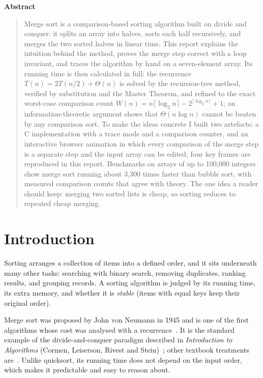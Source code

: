 \documentclass[11pt,a4paper]{article}
\theoremstyle{plain}
\theoremstyle{definition}
\renewcommand{\lg}{\log_2}
\begin{document}
\begin{center}{\large\bfseries Abstract}\end{center}
\begin{quote}\small
Merge sort is a comparison-based sorting algorithm built on divide and conquer: it splits an array into halves, sorts each half recursively, and merges the two sorted halves in linear time. This report explains the intuition behind the method, proves the merge step correct with a loop invariant, and traces the algorithm by hand on a seven-element array. Its running time is then calculated in full: the recurrence $T(n)=2T(n/2)+\Theta(n)$ is solved by the recursion-tree method, verified by substitution and the Master Theorem, and refined to the exact worst-case comparison count $W(n)=n\lceil\lg n\rceil-2^{\lceil\lg n\rceil}+1$; an information-theoretic argument shows that $\Theta(n\log n)$ cannot be beaten by any comparison sort. To make the ideas concrete I built two artefacts: a C implementation with a trace mode and a comparison counter, and an interactive browser animation in which every comparison of the merge step is a separate step and the input array can be edited; four key frames are reproduced in this report. Benchmarks on arrays of up to 100,000 integers show merge sort running about 3,300 times faster than bubble sort, with measured comparison counts that agree with theory. The one idea a reader should keep: merging two sorted lists is cheap, so sorting reduces to repeated cheap merging.
\end{quote}
\vspace{0.3em}
\begingroup
\renewcommand{\contentsname}{\large Contents}
\small
\setcounter{tocdepth}{1}
\tableofcontents
\endgroup
\newpage

\section{Introduction}
Sorting arranges a collection of items into a defined order, and it sits underneath many other tasks: searching with binary search, removing duplicates, ranking results, and grouping records. A sorting algorithm is judged by its running time, its extra memory, and whether it is \emph{stable} (items with equal keys keep their original order).

Merge sort was proposed by John von Neumann in 1945 and is one of the first algorithms whose cost was analysed with a recurrence~\cite{knuth3}. It is the standard example of the divide-and-conquer paradigm described in \emph{Introduction to Algorithms} (Cormen, Leiserson, Rivest and Stein)~\cite{clrs}; other textbook treatments are~\cite{sedgewick,kleinberg,dpv}. Unlike quicksort, its running time does not depend on the input order, which makes it predictable and easy to reason about.
\end{document}
